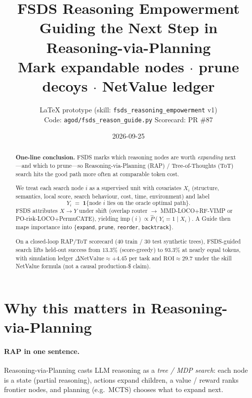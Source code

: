 \documentclass[11pt]{article}
\title{\textbf{FSDS Reasoning Empowerment}\\[0.35em]
\large Guiding the Next Step in Reasoning-via-Planning\\[0.15em]
\large Mark expandable nodes $\cdot$ prune decoys $\cdot$ NetValue ledger}
\author{LaTeX prototype \quad (skill: \texttt{fsds\_reasoning\_empowerment} v1)\\
Code: \texttt{agod/fsds\_reason\_guide.py} \quad Scorecard: PR \#87}
\date{2026-09-25}
\newcommand{\imp}{\mathrm{imp}}
\newcommand{\NV}{\mathrm{NetValue}}
\newcommand{\ROI}{\mathrm{ROI}}
\newcommand{\ind}{\mathbf{1}}
\begin{document}
\maketitle

\begin{abstract}
\textbf{One-line conclusion.}
FSDS marks which reasoning nodes are worth \emph{expanding} next---and which
to prune---so Reasoning-via-Planning (RAP) / Tree-of-Thoughts (ToT) search
hits the good path more often at comparable token cost.

We treat each search node $i$ as a supervised unit with covariates
$X_i$ (structure, semantics, local score, search behaviour, cost, time, environment)
and label
\[
  Y_i \;=\; \ind\{\text{node $i$ lies on the oracle optimal path}\}.
\]
FSDS attributes $X\!\to\!Y$ under shift (overlap router $\to$
MMD-LOCO$+$RF-VIMP or PO-risk-LOCO$+$PermuCATE), yielding
$\imp(i)\propto \widehat{P}(Y_i{=}1\mid X_i)$.
A Guide then maps importance into
\{\texttt{expand}, \texttt{prune}, \texttt{reorder}, \texttt{backtrack}\}.

On a closed-loop RAP/ToT scorecard (40 train / 30 test synthetic trees),
FSDS-guided search lifts held-out success from $13.3\%$ (score-greedy)
to $93.3\%$ at nearly equal tokens, with simulation ledger
$\Delta\NV \approx{+}4.45$ per task and $\ROI\approx 29.7$
under the skill NetValue formula (not a causal production-\$ claim).
\end{abstract}

\tableofcontents
\vspace{1em}

\section{Why this matters in Reasoning-via-Planning}
\label{sec:why-rap}

\paragraph{RAP in one sentence.}
Reasoning-via-Planning \cite{hao2023rap} casts LLM reasoning as a
\emph{tree / MDP search}: each node is a state (partial reasoning),
actions expand children, a value / reward ranks frontier nodes, and
planning (e.g.\ MCTS) chooses what to expand next.
\end{document}
